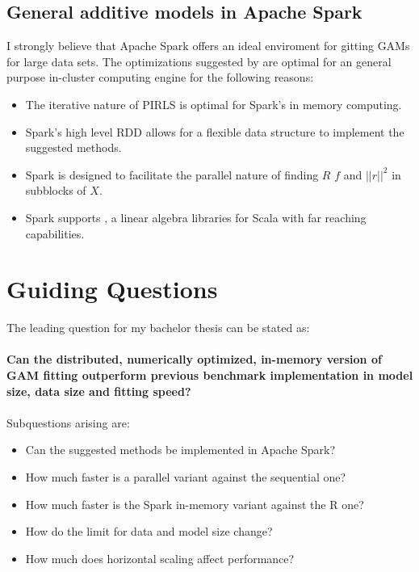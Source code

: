 \documentclass{article}
\begin{document}
    \subsection{General additive models in Apache Spark}
    I strongly believe that Apache Spark offers an ideal enviroment for gitting GAMs for large data sets. The optimizations suggested by \cite{bigdataGAM} are optimal for an general purpose in-cluster computing engine for the following reasons:
    \begin{itemize}
        \item The iterative nature of PIRLS is optimal for Spark's in memory computing.
        \item Spark's high level RDD allows for a flexible data structure to implement the suggested methods.
        \item Spark is designed to facilitate the parallel nature of finding $R$ $f$ and $||r||^2$ in subblocks of $X$.
        \item Spark supports \cite{Breeze}, a linear algebra libraries for Scala with far reaching capabilities.
    \end{itemize}

    \section{Guiding Questions}

    The leading question for my bachelor thesis can be stated as:
    \paragraph{Can the distributed, numerically optimized, in-memory version of GAM fitting outperform previous benchmark implementation in model size, data size and fitting speed?}

    \paragraph{}
    Subquestions arising are:
        \begin{itemize}
        \item Can the suggested methods be implemented in Apache Spark?
        \item How much faster is a parallel variant against the sequential one?
        \item How much faster is the Spark in-memory variant against the R one?
        \item How do the limit for data and model size change?
        \item How much does horizontal scaling affect performance?
        \end{itemize}
\end{document}
